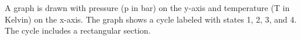 A graph is drawn with pressure (p in bar) on the y-axis and temperature (T in Kelvin) on the x-axis. The graph shows a cycle labeled with states 1, 2, 3, and 4. The cycle includes a rectangular section.